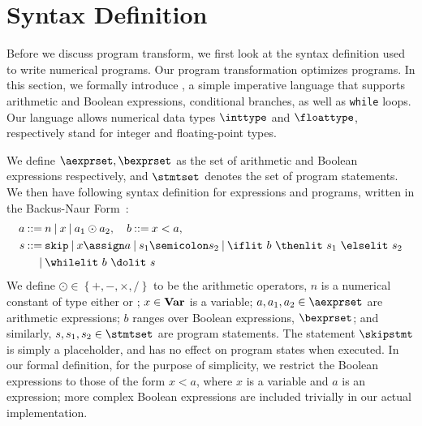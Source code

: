\section{Syntax Definition}
\label{sec:syntax_definition}

Before we discuss program transform, we first look at the syntax definition
used to write numerical programs.  Our program transformation optimizes
\numimp{} programs.  In this section, we formally introduce \numimp, a
simple imperative language that supports arithmetic and Boolean expressions,
conditional branches, as well as \texttt{while} loops.  Our language allows
numerical data types $\inttype$ and $\floattype$, respectively stand for
integer and floating-point types.

We define $\aexprset, \bexprset$ as the set of arithmetic and Boolean
expressions respectively, and $\stmtset$ denotes the set of program statements.
We then have following syntax definition for expressions and \numimp{}
programs, written in the Backus-Naur Form~\cite{knuth64}:
\newcommand{\syndef}{\ensuremath\mathbin{::=}}%
\newcommand{\synor}{\ensuremath\mathbin{\mid}}%
\begin{equation}
    \begin{aligned}
        a \syndef {} &
            n \synor
            x \synor
            a_1 \odot a_2,
        \quad b \syndef x < a, \\
        s \syndef {} &
            \mathtt{skip} \synor
            x \assign a \synor
            s_1 \semicolon s_2 \synor
            \iflit~b~\thenlit~s_1~\elselit~s_2 \\
        {} \synor {} &
            \whilelit~b~\dolit~s
    \end{aligned}
    \label{eq:program_syntax}
\end{equation}
We define $\odot \in \left\{ +, -, \times, / \right\}$ to be the arithmetic
operators, $n$ is a numerical constant of type either \inttype{} or \floattype;
$x \in \mathbf{Var}$ is a variable; $a, a_1, a_2 \in \aexprset$ are arithmetic
expressions; $b$ ranges over Boolean expressions, $\bexprset$; and similarly,
$s, s_1, s_2 \in \stmtset$ are program statements.  The statement $\skipstmt$
is simply a placeholder, and has no effect on program states when executed.  In
our formal definition, for the purpose of simplicity, we restrict the Boolean
expressions to those of the form $x < a$, where $x$ is a variable and $a$ is
an expression; more complex Boolean expressions are included trivially in our
actual implementation.

